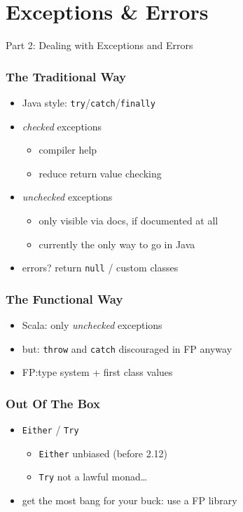 \documentclass{beamer}
\begin{document}
\section{Exceptions \& Errors}
\label{sec:exceptions-and-errors}

\begin{frame}[c]
  \begin{center}
    Part 2: Dealing with Exceptions and Errors
  \end{center}
\end{frame}

\begin{frame}
  \frametitle{The Traditional Way}
  \begin{itemize}
  \item Java style: \texttt{try}/\texttt{catch}/\texttt{finally}
  \item \textit{checked} exceptions
    \begin{itemize}
    \item compiler help
    \item reduce return value checking
    \end{itemize}
  \item \textit{unchecked} exceptions
    \begin{itemize}
    \item only visible via docs, if documented at all
    \item currently the only way to go in Java
    \end{itemize}
  \item errors? return \texttt{null} / custom classes
  \end{itemize}
\end{frame}

\begin{frame}
  \frametitle{The Functional Way}
  \begin{itemize}
  \item Scala: only \textit{unchecked} exceptions
  \item but: \texttt{throw} and \texttt{catch} discouraged in FP anyway
  \item FP:\@ type system + first class values
  \end{itemize}
\end{frame}

\begin{frame}[fragile]
  \frametitle{Out Of The Box}
  \begin{itemize}
  \item \texttt{Either} / \texttt{Try}
    \begin{itemize}
    \item \texttt{Either} unbiased (before 2.12)
    \item \texttt{Try} not a lawful monad\dots
    \end{itemize}
  \item get the most bang for your buck: use a FP library
  \end{itemize}
\end{frame}
\end{document}
